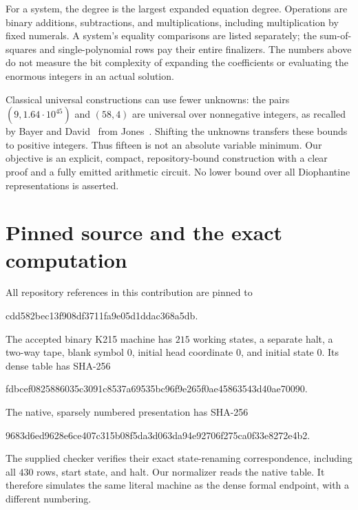 \documentclass[11pt]{article}
\theoremstyle{remark}\newtheorem{remark}[theorem]{Remark}
\begin{document}
For a system, the degree is the largest expanded equation degree. Operations are binary additions, subtractions, and multiplications, including multiplication by fixed numerals. A system's equality comparisons are listed separately; the sum-of-squares and single-polynomial rows pay their entire finalizers. The numbers above do not measure the bit complexity of expanding the coefficients or evaluating the enormous integers in an actual solution.

Classical universal constructions can use fewer unknowns: the pairs $(9,1.64\cdot10^{45})$ and $(58,4)$ are universal over nonnegative integers, as recalled by Bayer and David~\cite{BayerDavid2025} from Jones~\cite{Jones1982}. Shifting the unknowns transfers these bounds to positive integers. Thus fifteen is not an absolute variable minimum. Our objective is an explicit, compact, repository-bound construction with a clear proof and a fully emitted arithmetic circuit. No lower bound over all Diophantine representations is asserted.

\section{Pinned source and the exact computation}

All repository references in this contribution are pinned to
\begin{center}\ttfamily\small cdd582bec13f908df3711fa9e05d1ddac368a5db.\end{center}
The accepted binary K215 machine has $215$ working states, a separate halt, a two-way tape, blank symbol $0$, initial head coordinate $0$, and initial state $0$. Its dense table has SHA-256
\begin{center}\ttfamily\scriptsize fdbcef0825886035c3091c8537a69535bc96f9e265f0ae45863543d40ae70090.\end{center}
The native, sparsely numbered presentation has SHA-256
\begin{center}\ttfamily\scriptsize 9683d6ed9628e6ce407c315b08f5da3d063da94e92706f275ca0f33e8272e4b2.\end{center}
The supplied checker verifies their exact state-renaming correspondence, including all $430$ rows, start state, and halt. Our normalizer reads the native table. It therefore simulates the same literal machine as the dense formal endpoint, with a different numbering.
\end{document}
